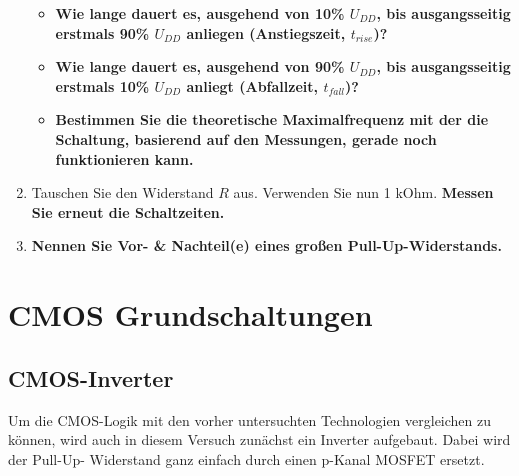 \documentclass[10pt]{scrreprt}
\begin{document}
\begin{enumerate}
\begin{itemize}
                \item \textbf{
                        Wie lange dauert es, ausgehend von 10\% $U_{DD}$, bis ausgangsseitig
                        erstmals 90\% $U_{DD}$ anliegen (Anstiegszeit, $t_{rise}$)?
                    }
                \item \textbf{
                        Wie lange dauert es, ausgehend von 90\% $U_{DD}$, bis ausgangsseitig
                        erstmals 10\% $U_{DD}$ anliegt (Abfallzeit, $t_{fall}$)?
                    }
                \item \textbf{
                        Bestimmen Sie die theoretische Maximalfrequenz mit der die Schaltung,
                        basierend auf den Messungen, gerade noch funktionieren kann.
                    }
            \end{itemize}
        \item Tauschen Sie den Widerstand $R$ aus. Verwenden Sie nun 1 kOhm. \textbf{Messen Sie
            erneut die Schaltzeiten.}
        \item \textbf{
                Nennen Sie Vor- \& Nachteil(e) eines großen Pull-Up-Widerstands.
                }
    \end{enumerate}

    \section{CMOS Grundschaltungen}
    \subsection{CMOS-Inverter}
    Um die CMOS-Logik mit den vorher untersuchten Technologien vergleichen zu können,
    wird auch in diesem Versuch zunächst ein Inverter aufgebaut. Dabei wird der Pull-Up-
    Widerstand ganz einfach durch einen p-Kanal MOSFET ersetzt.
\end{document}
